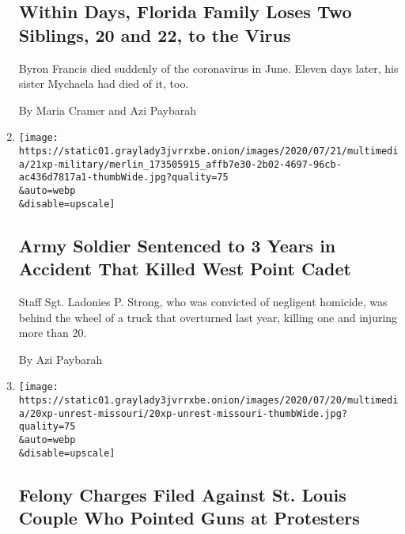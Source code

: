 \begin{enumerate}
  \hypertarget{within-days-florida-family-loses-two-siblings-20-and-22-to-the-virus}{%
  \subsection{Within Days, Florida Family Loses Two Siblings, 20 and 22,
  to the
  Virus}\label{within-days-florida-family-loses-two-siblings-20-and-22-to-the-virus}}

  Byron Francis died suddenly of the coronavirus in June. Eleven days
  later, his sister Mychaela had died of it, too.

  By Maria Cramer and Azi Paybarah
\item
  \href{/2020/07/21/us/west-point-accident-soldier-convicted.html}{}

  \texttt{[image: https://static01.graylady3jvrrxbe.onion/images/2020/07/21/multimedia/21xp-military/merlin\_173505915\_affb7e30-2b02-4697-96cb-ac436d7817a1-thumbWide.jpg?quality=75\\\&auto=webp\\\&disable=upscale]}

  \hypertarget{army-soldier-sentenced-to-3-years-in-accident-that-killed-west-point-cadet}{%
  \subsection{Army Soldier Sentenced to 3 Years in Accident That Killed
  West Point
  Cadet}\label{army-soldier-sentenced-to-3-years-in-accident-that-killed-west-point-cadet}}

  Staff Sgt. Ladonies P. Strong, who was convicted of negligent
  homicide, was behind the wheel of a truck that overturned last year,
  killing one and injuring more than 20.

  By Azi Paybarah
\item
  \href{/2020/07/20/us/mark-patricia-mccloskey-charges.html}{}

  \texttt{[image: https://static01.graylady3jvrrxbe.onion/images/2020/07/20/multimedia/20xp-unrest-missouri/20xp-unrest-missouri-thumbWide.jpg?quality=75\\\&auto=webp\\\&disable=upscale]}

  \hypertarget{felony-charges-filed-against-st-louis-couple-who-pointed-guns-at-protesters}{%
  \subsection{Felony Charges Filed Against St. Louis Couple Who Pointed
  Guns at
  Protesters}\label{felony-charges-filed-against-st-louis-couple-who-pointed-guns-at-protesters}}


\end{enumerate}
